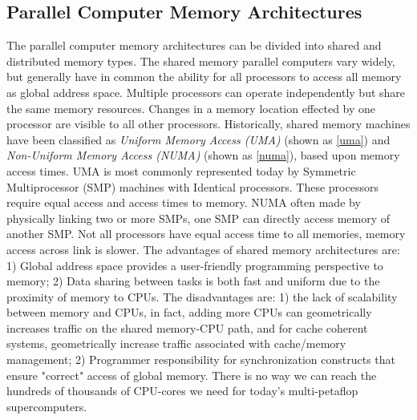 \subsection{Parallel Computer Memory Architectures}

The parallel computer memory architectures can be divided into shared and distributed memory types. The shared memory parallel computers vary widely, but generally have in common the ability for all processors to access all memory as global address space. Multiple processors can operate independently but share the same memory resources. Changes in a memory location effected by one processor are visible to all other processors. Historically, shared memory machines have been classified as \textit{Uniform Memory Access (UMA)} (shown as \ref{uma}) and \textit{Non-Uniform Memory Access (NUMA)} (shown as \ref{numa}), based upon memory access times. UMA is most commonly represented today by Symmetric Multiprocessor (SMP) machines with Identical processors. These processors require equal access and access times to memory. NUMA often made by physically linking two or more SMPs, one SMP can directly access memory of another SMP. Not all processors have equal access time to all memories, memory access across link is slower. The advantages of shared memory architectures are: 1) Global address space provides a user-friendly programming perspective to memory; 2) Data sharing between tasks is both fast and uniform due to the proximity of memory to CPUs. The disadvantages are: 1) the lack of scalability between memory and CPUs, in fact, adding more CPUs can geometrically increases traffic on the shared memory-CPU path, and for cache coherent systems, geometrically increase traffic associated with cache/memory management; 2) Programmer responsibility for synchronization constructs that ensure "correct" access of global memory. There is no way we can reach the hundreds of thousands of CPU-cores we need for today’s multi-petaflop supercomputers.

